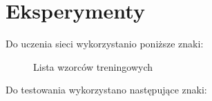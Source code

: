 \documentclass[12pt]{article}
\begin{document}
\section{Eksperymenty}
Do uczenia sieci wykorzystanio poniższe znaki:
\begin{figure}[H]%
\centering
{}
\caption{Lista wzorców treningowych}
\end{figure}
Do testowania wykorzystano następujące znaki:
%
%
%
%
\end{document}
